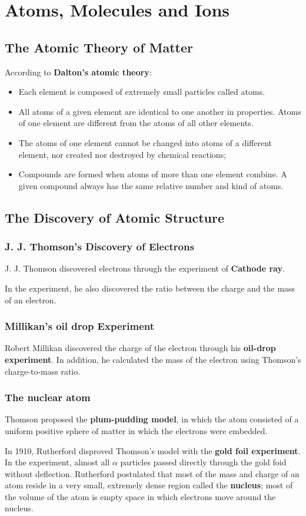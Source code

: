 \documentclass[12pt, a4paper]{report}
\newcommand{\hi}{\section}
\newcommand{\hii}{\subsection}
\begin{document}
\tableofcontents

\chapter{Atoms, Molecules and Ions}
\hi{The Atomic Theory of Matter}
    \par According to \textbf{Dalton's atomic theory}:
        \begin{itemize}
            \item Each element is composed of extremely small particles called atoms.
            \item All atoms of a given element are identical to one another in properties. Atoms of
            one element are different from the atoms of all other elements.
            \item The atoms of one element cannot be changed into atoms of a different element, nor
            created nor destroyed by chemical reactions;
            \item Compounds are formed when atoms of more than one element combine. A given compound
            always has the same relative number and kind of atoms.
        \end{itemize}

\hi{The Discovery of Atomic Structure}
    \hii{J. J. Thomson's Discovery of Electrons}
        \par J. J. Thomson discovered electrons through the experiment of \textbf{Cathode ray}.
        \par In the experiment, he also discovered the ratio between the charge and the mass of
        an electron.
    \hii{Millikan's oil drop Experiment}
        \par Robert Millikan discovered the charge of the electron through his \textbf{oil-drop
        experiment}.
        In addition, he calculated the mass of the electron using Thomson's charge-to-mass ratio.

    \hii{The nuclear atom}
        \par Thomson proposed the \textbf{plum-pudding model}, in which the atom consisted
        of a uniform positive sphere of matter in which the electrons were embedded.
        \par In 1910, Rutherford disproved Thomson's model with the \textbf{gold foil experiment}.
        In the experiment, almost all $\alpha$ particles passed directly through the gold foid
        without deflection. Rutherford postulated that most of the mass and charge of an atom
        reside in a very small, extremely dense region called the \textbf{nucleus}; most of the
        volume of the atom is empty space in which electrons move around the nucleus.
\end{document}
